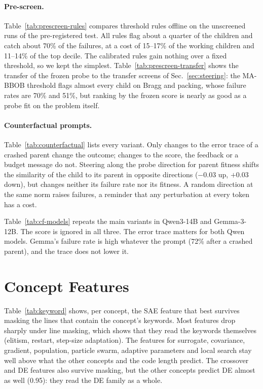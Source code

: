 

\paragraph{Pre-screen.}
Table~\ref{tab:prescreen-rules} compares threshold rules offline on the
unscreened runs of the pre-registered test. All rules flag about a
quarter of the children and catch about 70\% of the failures, at a cost
of 15--17\% of the working children and 11--14\% of the top decile. The
calibrated rules gain nothing over a fixed threshold, so we kept the
simplest. Table~\ref{tab:prescreen-transfer} shows the transfer of the
frozen probe to the transfer screens of Sec.~\ref{sec:steering}: the
MA-BBOB threshold flags almost every child on Bragg and packing, whose
failure rates are 70\% and 51\%, but ranking by the frozen score is
nearly as good as a probe fit on the problem itself.





\paragraph{Counterfactual prompts.}
Table~\ref{tab:counterfactual} lists every variant. Only changes to the
error trace of a crashed parent change the outcome; changes to the
score, the feedback or a budget message do not. Steering along the
probe direction for parent fitness shifts the similarity of the child
to its parent in opposite directions ($-0.03$ up, $+0.03$ down), but
changes neither its failure rate nor its fitness. A random direction at the same norm raises failures, a
reminder that any perturbation at every token has a cost.



Table~\ref{tab:cf-models} repeats the main variants in Qwen3-14B and
Gemma-3-12B. The score is ignored in all three. The error trace matters
for both Qwen models. Gemma's failure rate is high whatever the prompt
(72\% after a crashed parent), and the trace does not lower it.



\section{Concept Features}\label{app:concepts}

Table~\ref{tab:keyword} shows, per concept, the SAE feature that best
survives masking the lines that contain the concept's keywords. Most
features drop sharply under line masking, which shows that they read
the keywords themselves (elitism, restart, step-size adaptation). The
features for surrogate, covariance, gradient, population, particle
swarm, adaptive parameters and local search stay well above what the
other concepts and the code length predict. The crossover and DE
features also survive masking, but the other concepts predict DE
almost as well (0.95): they read the DE family as a whole.

